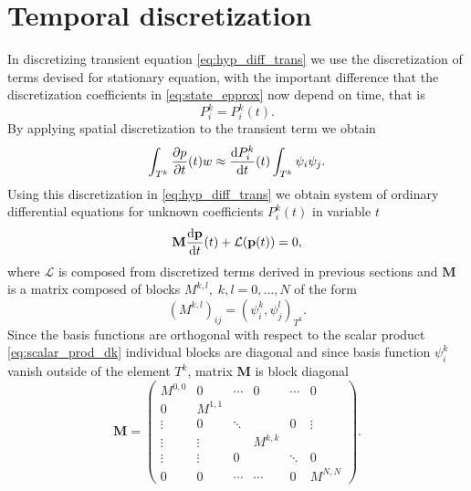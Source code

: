 \section{Temporal discretization}
\label{se:time_theory}
%
In discretizing transient equation \eqref{eq:hyp_diff_trans} we use the 
discretization of terms devised for stationary equation, with the important 
difference that the discretization coefficients in \eqref{eq:state_epprox} now 
depend on time, that is
\begin{equation}
P^k_i = P^k_i(t).
\end{equation}
By applying spatial discretization to the transient term we obtain
\begin{equation}
\int_{T^k}\frac{\partial p}{\partial t}(t)w \approx  \frac{\text{d}P^k_i}{\text{d}t}(t)\int_{T^k}\psi_i\psi_j. 
\end{equation}
Using this discretization in \eqref{eq:hyp_diff_trans} we obtain system of 
ordinary differential equations for unknown coefficients 
$P^k_i(t)$ in variable $t$
\begin{equation}
\label{eq:time_diff}
\mathbf{M}  \frac{\text{d}\mathbf{p}}{\text{d}t}(t) + \mathcal{L}(\mathbf{p}(t)) = 0,
\end{equation}
where $\mathcal{L}$  is composed from discretized terms  derived in previous 
sections and $\mathbf{M}$ is a matrix composed of blocks $M^{k,l},\; k,l=0, 
\ldots , N$ of the 
form
\begin{equation}
(M^{k,l})_{ij} = ( \psi^k_i,\psi^l_j)_{T^k}.
\end{equation}
Since the basis functions are orthogonal with respect to the scalar product 
\eqref{eq:scalar_prod_dk} individual blocks are diagonal and since basis 
function $\psi^k_i$ vanish outside of the element $T^k$, matrix $\mathbf{M}$ 
is block diagonal 
\begin{equation}
\mathbf{M}  = \begin{pmatrix}
M^{0,0}      &    0   &\cdots&  0   &\cdots&0\\
0         &   M^{1,1}  &      &      &      &\\
\vdots     &    0   &\ddots&      &  0   &\vdots\\
\vdots     & \vdots &      & M^{k,k}  &      &\\
\vdots   & \vdots & 0    &      &\ddots&0\\
0         &   0    &\cdots&\cdots&   0  &M^{N,N} 
\end{pmatrix}.
\end{equation}
